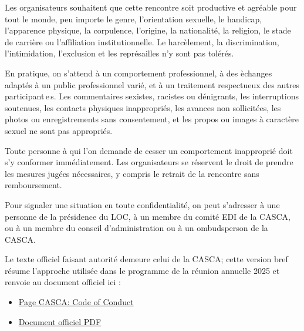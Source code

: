 
Les organisateurs souhaitent que cette rencontre soit productive et agr\'eable
pour tout le monde, peu importe le genre, l'orientation sexuelle, le handicap,
l'apparence physique, la corpulence, l'origine, la nationalit\'e, la religion,
le stade de carri\`ere ou l'affiliation institutionnelle. Le harc\`element, la
discrimination, l'intimidation, l'exclusion et les repr\'esailles n'y sont pas
tol\'er\'es.

En pratique, on s'attend \`a un comportement professionnel, \`a des \`echanges
adapt\'es \`a un public professionnel vari\'e, et \`a un traitement respectueux des
autres participant\,e\,s. Les commentaires sexistes, racistes ou d\'enigrants,
les interruptions soutenues, les contacts physiques inappropri\'es, les avances
non sollicitées, les photos ou enregistrements sans consentement, et les propos
ou images \`a caract\`ere sexuel ne sont pas appropri\'es.

Toute personne \`a qui l'on demande de cesser un comportement inappropri\'e doit
s'y conformer imm\'ediatement. Les organisateurs se r\'eservent le droit de
prendre les mesures jug\'ees n\'ecessaires, y compris le retrait de la rencontre
sans remboursement.

Pour signaler une situation en toute confidentialit\'e, on peut s'adresser \`a
une personne de la pr\'esidence du LOC, \`a un membre du comit\'e EDI de la CASCA,
ou \`a un membre du conseil d'administration ou \`a un ombudsperson de la CASCA.

Le texte officiel faisant autorit\'e demeure celui de la CASCA; cette version
bref r\'esume l'approche utilis\'ee dans le programme de la r\'eunion annuelle 2025
et renvoie au document officiel ici :

\begin{itemize}
  \item \href{https://casca.ca/?page_id=22442}{Page CASCA: Code of Conduct}
  \item \href{https://casca.ca/wp-content/uploads/2025/12/The-CASCA-Code-of-Conduct.pdf}{Document officiel PDF}
\end{itemize}